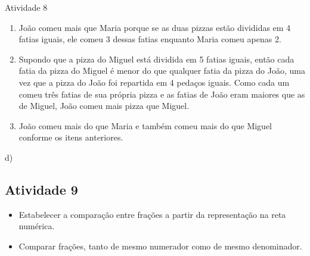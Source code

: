 \begin{multicols}{2}
\begin{resposta*}{Atividade 8}  
\begin{enumerate} [\quad a)] %
    \item       João comeu mais que Maria porque se as duas pizzas estão divididas em 4 fatias iguais, ele comeu 3 dessas fatias enquanto Maria comeu apenas 2.
    \item       Supondo que a pizza do Miguel está dividida em 5 fatias iguais, então cada fatia da pizza do Miguel é menor do que qualquer fatia da pizza do João, uma vez que a pizza do João foi repartida em 4 pedaços iguais. Como cada um comeu três fatias de sua própria pizza e as fatias de João eram maiores que as de Miguel, João comeu mais pizza que Miguel.
    \item       João comeu mais do que Maria e também comeu mais do que Miguel conforme os itens anteriores.
\end{enumerate} %
\quad \;d)    
     

 
 \end{resposta*}

\subsection{Atividade 9}

\begin{itemize} %
    \item       Estabelecer a comparação entre frações a partir da representação na reta numérica.
    \item       Comparar frações, tanto de mesmo numerador como de mesmo denominador.
\end{itemize} %


\end{multicols}
